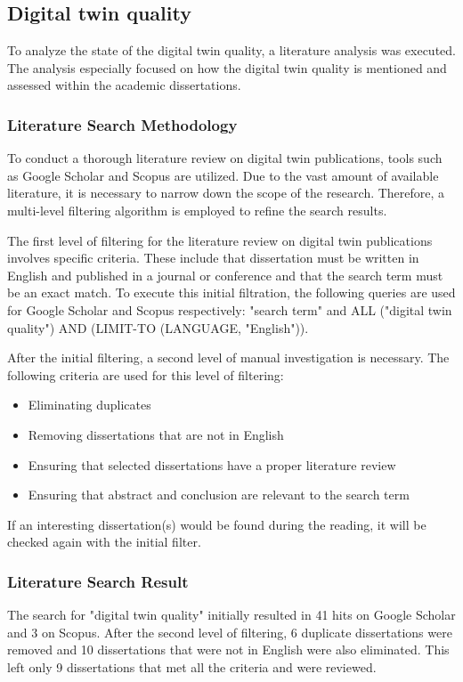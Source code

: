 \documentclass{llncs}
\begin{document}
    \subsection{Digital twin quality}
    To analyze the state of the digital twin quality, a literature analysis was executed. 
    The analysis especially focused on how the digital twin quality is mentioned and assessed within the academic dissertations.

    \subsubsection*{Literature Search Methodology}
    To conduct a thorough literature review on digital twin publications, tools such as Google Scholar and Scopus are utilized. Due to the vast amount of available literature, it is necessary to narrow down the scope of the research. 
    Therefore, a multi-level filtering algorithm is employed to refine the search results.

    The first level of filtering for the literature review on digital twin publications involves specific criteria. These include that dissertation must be written in English and 
    published in a journal or conference and that the search term must be an exact match. To execute this initial filtration, 
    the following queries are used for Google Scholar and Scopus respectively: "search term" and ALL ("digital twin quality") AND (LIMIT-TO (LANGUAGE, "English")).

    After the initial filtering, a second level of manual investigation is necessary. The following criteria are used for this level of filtering:    
    \begin{itemize}
        \item  Eliminating duplicates
        \item  Removing dissertations that are not in English
        \item  Ensuring that selected dissertations have a proper literature review
        \item  Ensuring that abstract and conclusion are relevant to the search term
    \end{itemize}
    If an interesting dissertation(s) would be found during the reading, it will be checked again with the initial filter.
    \subsubsection*{Literature Search Result}
    The search for "digital twin quality" initially resulted in 41 hits on Google Scholar and 3 on Scopus. 
    After the second level of filtering, 6 duplicate dissertations were removed and 10 dissertations that were not in English were also eliminated. 
    This left only 9 dissertations that met all the criteria and were reviewed.
\end{document}
